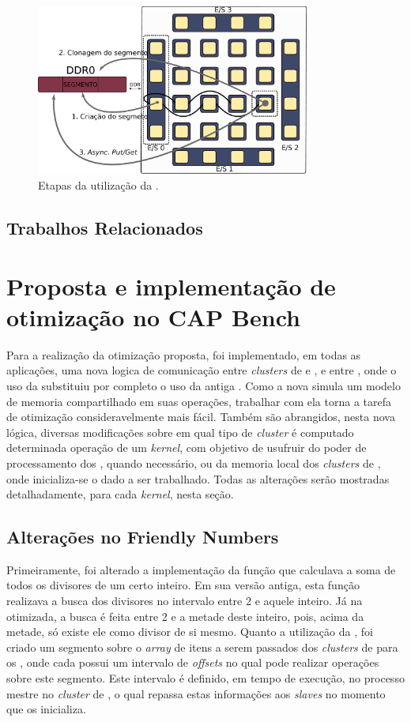 \documentclass[a4paper,11pt]{article}
\newcommand{\capb}{CAP Bench\xspace}
\begin{document}
\begin{figure}[h]
\centering
\includegraphics[width=9cm, keepaspectratio]{figs/putget.pdf}
\caption{Etapas da utilização da \api \async.}\par
\label{fig:asyncOverview}
\end{figure}

\subsection{Trabalhos Relacionados}

\section{Proposta e implementação de otimização no \capb}
\label{sec:capbMPPA}

Para a realização da otimização proposta, foi implementado, em todas as aplicações, uma nova logica de comunicação entre \textit{clusters} de \io e \ccs, e entre \ccs, onde o uso da \async substituiu por completo o uso da antiga \ipc. Como a nova \api simula um modelo de memoria compartilhado em suas operações, trabalhar com ela torna a tarefa de otimização consideravelmente mais fácil. Também são abrangidos, nesta nova lógica, diversas modificações sobre em qual tipo de \textit{cluster} é computado determinada operação de um \textit{kernel}, com objetivo de usufruir do poder de processamento dos \ccs, quando necessário, ou da memoria local dos \textit{clusters} de \io, onde inicializa-se o dado a ser trabalhado. Todas as alterações serão mostradas detalhadamente, para cada \textit{kernel}, nesta seção.

\subsection{Alterações no Friendly Numbers}

Primeiramente, foi alterado a implementação da função que calculava a soma de todos os divisores de um certo inteiro. Em sua versão antiga, esta função realizava a busca dos divisores no intervalo entre 2 e aquele inteiro. Já na otimizada, a busca é feita entre 2 e a metade deste inteiro, pois, acima da metade, só existe ele como divisor de si mesmo. Quanto a utilização da \async, foi criado um segmento sobre o \textit{array} de itens a serem passados dos \textit{clusters} de \io para os \ccs, onde cada \cc possui um intervalo de \textit{offsets} no qual pode realizar operações sobre este segmento. Este intervalo é definido, em tempo de execução, no processo mestre no \textit{cluster} de \io, o qual repassa estas informações aos \textit{slaves} no momento que os inicializa.
\end{document}
